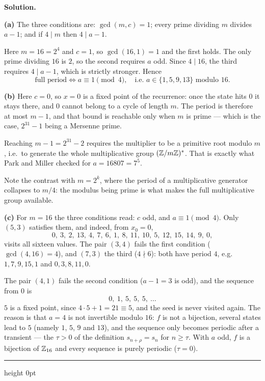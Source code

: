 \documentclass[11pt]{article}
\newenvironment{solution}
    {\par\nobreak\smallskip\noindent\textbf{Solution.}\par\nobreak\smallskip}
    {\par\medskip\hrule height 0pt\medskip}
\begin{document}
\begin{solution}
\textbf{(a)} The three conditions are: $\gcd(m,c) = 1$; every prime dividing $m$ divides $a-1$; and if $4 \mid m$ then $4 \mid a-1$.

Here $m = 16 = 2^4$ and $c = 1$, so $\gcd(16,1) = 1$ and the first holds. The only prime dividing $16$ is $2$, so the second requires $a$ odd. Since $4 \mid 16$, the third requires $4 \mid a-1$, which is strictly stronger. Hence
\[
\text{full period} \iff a \equiv 1 \pmod 4, \quad \text{i.e.\ } a \in \lbrace 1, 5, 9, 13 \rbrace \text{ modulo } 16 .
\]

\textbf{(b)} Here $c = 0$, so $x = 0$ is a fixed point of the recurrence: once the state hits $0$ it stays there, and $0$ cannot belong to a cycle of length $m$. The period is therefore at most $m-1$, and that bound is reachable only when $m$ is prime --- which is the case, $2^{31}-1$ being a Mersenne prime.

Reaching $m-1 = 2^{31}-2$ requires the multiplier to be a {\red primitive root} modulo $m$, i.e.\ to generate the whole multiplicative group $({\mathbb{Z}}/m{\mathbb{Z}})^*$. That is exactly what Park and Miller checked for $a = 16807 = 7^5$.

\medskip
Note the contrast with $m = 2^k$, where the period of a multiplicative generator collapses to $m/4$: the modulus being prime is what makes the full multiplicative group available.

\medskip
\textbf{(c)} For $m = 16$ the three conditions read: $c$ odd, and $a \equiv 1 \pmod 4$. Only $(5,3)$ satisfies them, and indeed, from $x_0 = 0$,
\[
0,\ 3,\ 2,\ 13,\ 4,\ 7,\ 6,\ 1,\ 8,\ 11,\ 10,\ 5,\ 12,\ 15,\ 14,\ 9,\ 0,
\]
visits all sixteen values. The pair $(3,4)$ fails the first condition ($\gcd(4,16) = 4$), and $(7,3)$ the third ($4 \nmid 6$): both have period $4$, e.g.\ $1, 7, 9, 15, 1$ and $0, 3, 8, 11, 0$.

The pair $(4,1)$ fails the second condition ($a - 1 = 3$ is odd), and the sequence from $0$ is
\[
0,\ 1,\ 5,\ 5,\ 5,\ \ldots
\]
$5$ is a fixed point, since $4 \cdot 5 + 1 = 21 \equiv 5$, and the seed is never visited again. The reason is that $a = 4$ is not invertible modulo $16$: $f$ is not a bijection, several states lead to $5$ (namely $1$, $5$, $9$ and $13$), and the sequence only becomes periodic after a transient --- the $\tau > 0$ of the definition $s_{n+\rho} = s_n$ for $n \geq \tau$. With $a$ odd, $f$ is a bijection of ${\mathbb{Z}}_{16}$ and every sequence is purely periodic ($\tau = 0$).
\end{solution}
\end{document}
